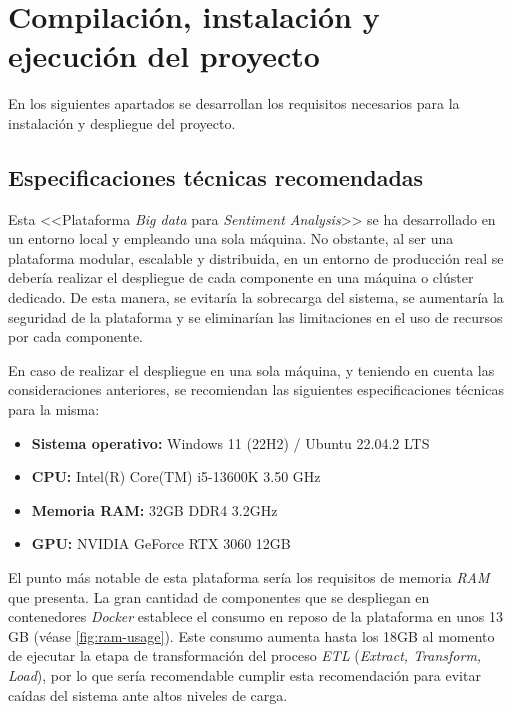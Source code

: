 \section{Compilación, instalación y ejecución del proyecto}

En los siguientes apartados se desarrollan los requisitos necesarios para la instalación y despliegue del proyecto.

\subsection{Especificaciones técnicas recomendadas}

Esta <<Plataforma \textit{Big data} para \textit{Sentiment Analysis}>> se ha desarrollado en un entorno local y empleando una sola máquina. No obstante, al ser una plataforma modular, escalable y distribuida, en un entorno de producción real se debería realizar el despliegue de cada componente en una máquina o clúster dedicado. De esta manera, se evitaría la sobrecarga del sistema, se aumentaría la seguridad de la plataforma y se eliminarían las limitaciones en el uso de recursos por cada componente.

En caso de realizar el despliegue en una sola máquina, y teniendo en cuenta las consideraciones anteriores, se recomiendan las siguientes especificaciones técnicas para la misma:

\begin{itemize}
    \item \textbf{Sistema operativo:} Windows 11 (22H2) / Ubuntu 22.04.2 LTS
    \item \textbf{CPU:} Intel(R) Core(TM) i5-13600K 3.50 GHz
    \item \textbf{Memoria RAM:} 32GB DDR4 3.2GHz
    \item \textbf{GPU:} NVIDIA GeForce RTX 3060 12GB
\end{itemize}

El punto más notable de esta plataforma sería los requisitos de memoria \textit{RAM} que presenta. La gran cantidad de componentes que se despliegan en contenedores \textit{Docker} establece el consumo en reposo de la plataforma en unos 13 GB (véase \autoref{fig:ram-usage}). Este consumo aumenta hasta los 18GB al momento de ejecutar la etapa de transformación del proceso \textit{ETL} (\textit{Extract, Transform, Load}), por lo que sería recomendable cumplir esta recomendación para evitar caídas del sistema ante altos niveles de carga.


